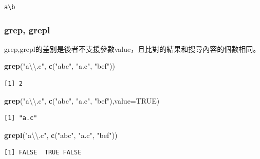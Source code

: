\documentclass[]{book}
\newenvironment{Shaded}{\begin{snugshade}}{\end{snugshade}}
\newcommand{\CharTok}[1]{\textcolor[rgb]{0.31,0.60,0.02}{#1}}
\newcommand{\DataTypeTok}[1]{\textcolor[rgb]{0.13,0.29,0.53}{#1}}
\newcommand{\KeywordTok}[1]{\textcolor[rgb]{0.13,0.29,0.53}{\textbf{#1}}}
\newcommand{\NormalTok}[1]{#1}
\newcommand{\OtherTok}[1]{\textcolor[rgb]{0.56,0.35,0.01}{#1}}
\newcommand{\StringTok}[1]{\textcolor[rgb]{0.31,0.60,0.02}{#1}}
\theoremstyle{definition}
\theoremstyle{definition}
\theoremstyle{definition}
\theoremstyle{remark}
\begin{document}
\begin{verbatim}
a\b
\end{verbatim}

\hypertarget{grep-grepl}{%
\subsubsection{grep, grepl}\label{grep-grepl}}

grep,grepl的差別是後者不支援參數value，且比對的結果和搜尋內容的個數相同。

\begin{Shaded}
\begin{Highlighting}[]
\KeywordTok{grep}\NormalTok{(}\StringTok{"a}\CharTok{\textbackslash{}\textbackslash{}}\StringTok{.c"}\NormalTok{, }\KeywordTok{c}\NormalTok{(}\StringTok{"abc"}\NormalTok{, }\StringTok{"a.c"}\NormalTok{, }\StringTok{"bef"}\NormalTok{))}
\end{Highlighting}
\end{Shaded}

\begin{verbatim}
[1] 2
\end{verbatim}

\begin{Shaded}
\begin{Highlighting}[]
\KeywordTok{grep}\NormalTok{(}\StringTok{"a}\CharTok{\textbackslash{}\textbackslash{}}\StringTok{.c"}\NormalTok{, }\KeywordTok{c}\NormalTok{(}\StringTok{"abc"}\NormalTok{, }\StringTok{"a.c"}\NormalTok{, }\StringTok{"bef"}\NormalTok{),}\DataTypeTok{value=}\OtherTok{TRUE}\NormalTok{)}
\end{Highlighting}
\end{Shaded}

\begin{verbatim}
[1] "a.c"
\end{verbatim}

\begin{Shaded}
\begin{Highlighting}[]
\KeywordTok{grepl}\NormalTok{(}\StringTok{"a}\CharTok{\textbackslash{}\textbackslash{}}\StringTok{.c"}\NormalTok{, }\KeywordTok{c}\NormalTok{(}\StringTok{"abc"}\NormalTok{, }\StringTok{"a.c"}\NormalTok{, }\StringTok{"bef"}\NormalTok{))}
\end{Highlighting}
\end{Shaded}

\begin{verbatim}
[1] FALSE  TRUE FALSE
\end{verbatim}
\end{document}
